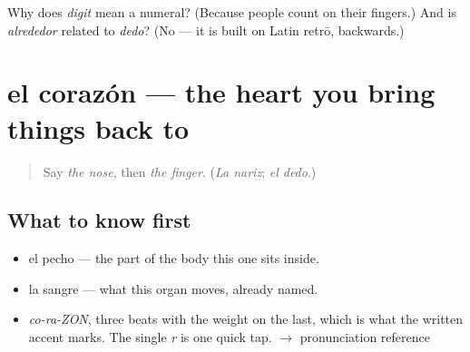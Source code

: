 \begin{tcolorbox}[breakable,colback=teal!4,colframe=teal!35!black,title={Before you move on}]
Why does \emph{digit} mean a numeral? (Because people count on their fingers.) And is \emph{alrededor} related to \emph{dedo}? (No — it is built on Latin retrō, backwards.)
\end{tcolorbox}
\section[el corazón]{el corazón — the heart you bring things back to}

\label{lesson:ES-C364-corazon}



\begin{quote}
Say \emph{the nose}, then \emph{the finger}. (\emph{La nariz}; \emph{el dedo}.)
\end{quote}

\subsection*{What to know first}
\begin{itemize}
\raggedright
  \item el pecho — the part of the body this one sits inside.
  \item la sangre — what this organ moves, already named.
\end{itemize}

\begin{sounds}
\begin{itemize}
\raggedright
  \item \emph{co-ra-ZON}, three beats with the weight on the last, which is what the written accent marks. The single \emph{r} is one quick tap. $\to$ pronunciation reference
\end{itemize}
\end{sounds}

